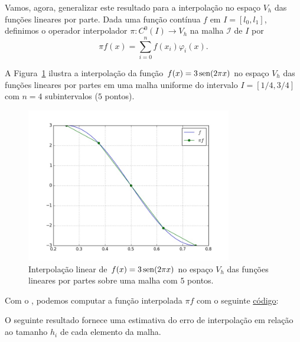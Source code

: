 Vamos, agora, generalizar este resultado para a interpolação no espaço $V_h$ das funções lineares por parte. Dada uma função contínua $f$ em $I = [l_0, l_1]$, definimos o operador interpolador $\pi: C^0(I)\to V_h$ na malha $\mathcal{I}$ de $I$ por
\begin{equation}
  \pi f(x) = \sum_{i=0}^{n}f(x_i)\varphi_i(x).
\end{equation}

\begin{ex}\label{ex:interp_linpartes}
  A Figura~\ref{fig:ex_interp_linpartes} ilustra a interpolação da função $f(x)=3\operatorname{sen}(2\pi x)$ no espaço $V_h$ das funções lineares por partes em uma malha uniforme do intervalo $I=[1/4, 3/4]$ com $n=4$ subintervalos ($5$ pontos). 

  \begin{figure}[h!]
    \centering
    \includegraphics[width=0.8\textwidth]{./cap_mef1d/dados/ex_interp_linpartes/ex_interp_linpartes}
    \caption{Interpolação linear de $f(x)=3\operatorname{sen}(2\pi x)$ no espaço $V_h$ das funções lineares por partes sobre uma malha com $5$ pontos.}
    \label{fig:ex_interp_linpartes}
  \end{figure}

\ifispython
Com o \fenics, podemos computar a função interpolada $\pi f$ com o seguinte \href{https://github.com/phkonzen/notas/blob/master/src/MetodoElementosFinitos/cap_mef1d/dados/ex_interp_linpartes/ex_interp_linpartes.py}{código}:

\fi
\end{ex}

O seguinte resultado fornece uma estimativa do erro de interpolação em relação ao tamanho $h_i$ de cada elemento da malha.

